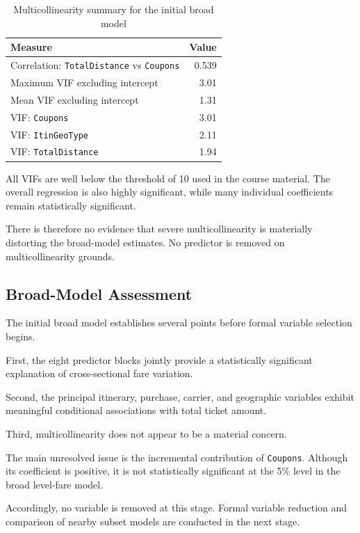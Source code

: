 \documentclass[11pt,a4paper]{article}
\begin{document}
\begin{table}[H]
\centering
\caption{Multicollinearity summary for the initial broad model}
\label{tab:multicollinearity-summary}
\begin{tabular}{lr}
\toprule
\textbf{Measure} & \textbf{Value} \\
\midrule
Correlation: \texttt{TotalDistance} vs \texttt{Coupons} & 0.539 \\
Maximum VIF excluding intercept & 3.01 \\
Mean VIF excluding intercept & 1.31 \\
VIF: \texttt{Coupons} & 3.01 \\
VIF: \texttt{ItinGeoType} & 2.11 \\
VIF: \texttt{TotalDistance} & 1.94 \\
\bottomrule
\end{tabular}
\end{table}

All VIFs are well below the threshold of 10 used in the course material. The overall regression is also highly significant, while many individual coefficients remain statistically significant.

There is therefore no evidence that severe multicollinearity is materially distorting the broad-model estimates. No predictor is removed on multicollinearity grounds.

\subsection{Broad-Model Assessment}

The initial broad model establishes several points before formal variable selection begins.

First, the eight predictor blocks jointly provide a statistically significant explanation of cross-sectional fare variation.

Second, the principal itinerary, purchase, carrier, and geographic variables exhibit meaningful conditional associations with total ticket amount.

Third, multicollinearity does not appear to be a material concern.

The main unresolved issue is the incremental contribution of \texttt{Coupons}. Although its coefficient is positive, it is not statistically significant at the 5\% level in the broad level-fare model.

Accordingly, no variable is removed at this stage. Formal variable reduction and comparison of nearby subset models are conducted in the next stage.
\end{document}
